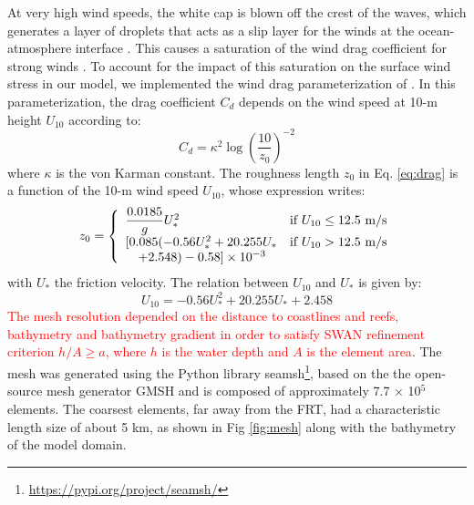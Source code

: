 \documentclass[11pt,a4paper]{article}
\begin{document}
At very high wind speeds, the white cap is blown off the crest of the waves, which generates a layer of droplets that acts as a slip layer for the winds at the ocean-atmosphere interface \citep{holthuijsen2012wind}. This causes a saturation of the wind drag coefficient for strong winds \citep{donelan2004limiting,powell2003reduced}. To account for the impact of this saturation on the surface wind stress in our model, we implemented the wind drag parameterization of \cite{moon2007physics}. In this parameterization, the drag coefficient $C_d$ depends on the wind speed at 10-m height $U_{10}$ according to:
\begin{equation}
    C_d = \kappa^2 \log\left(\dfrac{10}{z_0}\right)^{-2}\label{eq:drag}
\end{equation}
where $\kappa$ is the von Karman constant. The roughness length $z_0$ in Eq. \ref{eq:drag} is a function of the 10-m wind speed $U_{10}$, whose expression writes: 
\begin{equation}
    z_0 =\left\{\begin{array}[]{ll}
        \dfrac{0.0185}{g}U_{\ast}^2 & \text{if }U_{10} \leq 12.5\text{ m/s} \\
        \lbrack 0.085(-0.56U_{\ast}^2+20.255U_{\ast} & \text{if }U_{10} > 12.5\text{ m/s} \\
        \quad +2.548) - 0.58\rbrack\times 10^{-3} 
    \end{array}\right.
\end{equation}
with $U_\ast$ the friction velocity. The relation between $U_{10}$ and $U_{\ast}$ is given by:
\begin{equation}
    U_{10}=-0.56U_{\ast}^2+20.255U_{\ast}+2.458
\end{equation} 
\textcolor{red}{The mesh resolution depended on the distance to coastlines and reefs, bathymetry and bathymetry gradient in order to satisfy SWAN refinement criterion $h/A\geq a$, where $h$ is the water depth and $A$ is the element area}. The mesh was generated using the Python library seamsh\footnote{\url{https://pypi.org/project/seamsh/}}, based on the the open-source mesh generator GMSH \citep{geuzaine2009gmsh} and is composed of approximately 7.7 $\times$ 10$^5$ elements. The coarsest elements, far away from the FRT, had a characteristic length size of about 5 km, as shown in Fig \ref{fig:mesh} along with the bathymetry of the model domain.
\end{document}
